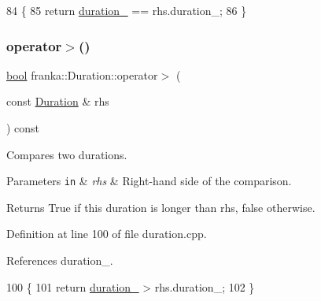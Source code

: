 \begin{DoxyCode}
84                                                             \{
85   \textcolor{keywordflow}{return} \hyperlink{classfranka_1_1Duration_ae446c403b200f0dbf92fb51ca21e82ff}{duration\_} == rhs.duration\_;
86 \}
\end{DoxyCode}
\mbox{\label{classfranka_1_1Duration_a1702ec9121fe6cff1de533d116edcce0}} 
\subsubsection{\texorpdfstring{operator$>$()}{operator>()}}
{\footnotesize\ttfamily \hyperlink{classbool}{bool} franka\+::\+Duration\+::operator$>$ (\begin{DoxyParamCaption}\item[{const \hyperlink{classfranka_1_1Duration}{Duration} \&}]{rhs }\end{DoxyParamCaption}) const\hspace{0.3cm}{\ttfamily [noexcept]}}

Compares two durations.


\begin{DoxyParams}[1]{Parameters}
\mbox{\tt in}  & {\em rhs} & Right-\/hand side of the comparison.\\
\hline
\end{DoxyParams}
\begin{DoxyReturn}{Returns}
True if this duration is longer than rhs, false otherwise. 
\end{DoxyReturn}


Definition at line 100 of file duration.\+cpp.



References duration\+\_\+.


\begin{DoxyCode}
100                                                            \{
101   \textcolor{keywordflow}{return} \hyperlink{classfranka_1_1Duration_ae446c403b200f0dbf92fb51ca21e82ff}{duration\_} > rhs.duration\_;
102 \}
\end{DoxyCode}
\mbox{\label{classfranka_1_1Duration_a5bc498cf96d96f5908d6bd93eea491aa}} 
